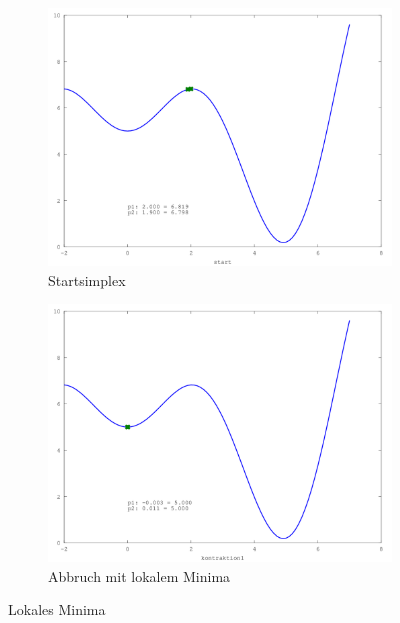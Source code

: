 \begin{figure}[htb]
\centering
\begin{subfigure}[b]{0.49\textwidth}
\centering
\includegraphics[width=\textwidth]{../bilder/LokMinima/sinx_x001.png}
\caption{Startsimplex}
\end{subfigure} \begin{subfigure}[b]{0.49\textwidth}
\centering
\includegraphics[width=\textwidth]{../bilder/LokMinima/sinx_x010.png}
\caption{Abbruch mit lokalem Minima}
\end{subfigure}

\caption{Lokales Minima}
\label{fig:downhillLokMinima}
\end{figure}

